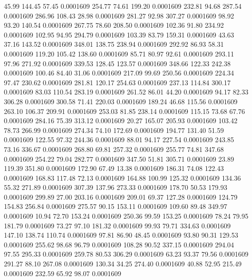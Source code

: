   45.99  144.45   57.45   0.0001609
 254.77   74.61  199.20   0.0001609
 232.81   94.68  287.54   0.0001609
 286.96  108.43   28.98   0.0001609
 281.27   92.98  307.27   0.0001609
  98.92   93.20  140.54   0.0001609
 267.75   78.60  208.50   0.0001609
 102.36   91.80  234.92   0.0001609
 102.95   94.95  294.79   0.0001609
 103.39   83.79  159.31   0.0001609
  43.63   37.16  143.52   0.0001609
 348.01  138.75  238.94   0.0001609
 292.92   86.93   58.31   0.0001609
 119.20  105.42  138.60   0.0001609
  85.71   80.97   92.61   0.0001609
 293.11   97.96  271.92   0.0001609
 339.53  128.45  123.57   0.0001609
 348.66  122.33  242.38   0.0001609
 100.46   84.40   31.06   0.0001609
 217.09   99.69  250.56   0.0001609
 224.34   97.47  230.62   0.0001609
 281.81  120.17  254.63   0.0001609
 237.13  114.84  300.17   0.0001609
  83.03  110.54  283.19   0.0001609
 261.52   86.01   44.20   0.0001609
  94.17   82.33  306.28   0.0001609
 300.58   71.41  220.03   0.0001609
 189.24   46.68  115.56   0.0001609
 263.10  106.37  209.91   0.0001609
 253.03   81.85  238.14   0.0001609
 115.15   73.68   67.76   0.0001609
 284.16   75.39  313.12   0.0001609
  20.27  165.07  205.93   0.0001609
 103.42   78.73  266.99   0.0001609
 274.34   74.10  172.69   0.0001609
 194.77  131.40   51.59   0.0001609
 122.55   97.32  244.36   0.0001609
  88.01   94.17  227.54   0.0001609
 243.85   73.16  336.67   0.0001609
 268.80   69.81  257.32   0.0001609
 255.77   74.81  347.68   0.0001609
 254.22   79.04  282.77   0.0001609
 347.50   51.81  305.71   0.0001609
  23.89  119.39  351.80   0.0001609
 172.90   67.49   13.38   0.0001609
 186.31   74.08  122.43   0.0001609
 168.83  117.48   72.13   0.0001609
 164.88  100.99  125.32   0.0001609
 134.36   55.32  271.89   0.0001609
 307.39  137.96  273.33   0.0001609
 178.70   50.53  179.93   0.0001609
 299.89   27.00  203.16   0.0001609
 209.01   69.37  127.28   0.0001609
 124.79  154.83  256.84   0.0001609
 275.57   90.15  153.11   0.0001609
 109.60   89.48  349.97   0.0001609
  10.94   72.70  153.24   0.0001609
 250.36   99.59  153.25   0.0001609
  78.24   79.95  181.79   0.0001609
  73.27   97.10  181.32   0.0001609
  99.93   79.71  334.63   0.0001609
 147.10  138.74  110.74   0.0001609
  97.81   86.90   48.45   0.0001609
  93.80   90.31  129.53   0.0001609
 255.62   98.68   96.79   0.0001609
 108.28   90.52  337.15   0.0001609
 294.04   97.55  295.33   0.0001609
 259.78   80.53  306.29   0.0001609
  63.23   93.37   79.56   0.0001609
 291.27   88.10  267.08   0.0001609
 130.34   34.25  274.40   0.0001609
  40.88   52.95  215.49   0.0001609
 232.59   65.92   98.07   0.0001609
